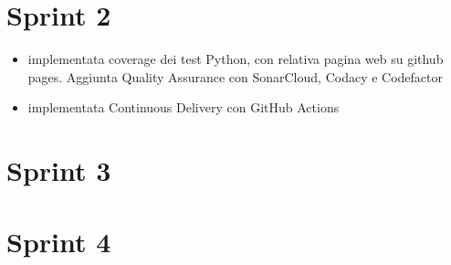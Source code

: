 \section{Sprint 2}
\begin{itemize}
    \item implementata coverage dei test Python, con relativa pagina web su github pages. Aggiunta Quality Assurance con SonarCloud, Codacy e Codefactor
    \item implementata Continuous Delivery con GitHub Actions
\end{itemize}

\section{Sprint 3}


\section{Sprint 4}


